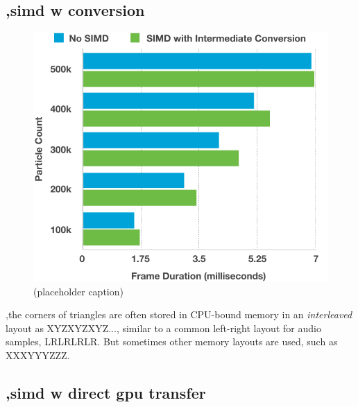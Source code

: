 \documentclass[11pt, a4paper, twocolumn]{article}
\begin{document}
\subsection{,simd w conversion} \label{sec:simd}

\begin{figure}[h]
\includegraphics[width=\linewidth]{nosimd-slowsimd}
\caption{(placeholder caption)}
\label{fig:nosimd-slowsimd}
\end{figure}

,the corners of triangles are often stored in CPU-bound memory in an \emph{interleaved} layout as XYZXYZXYZ..., similar to a common left-right layout for audio samples, LRLRLRLR. But sometimes other memory layouts are used, such as XXXYYYZZZ.

\subsection{,simd w direct gpu transfer}
\end{document}
